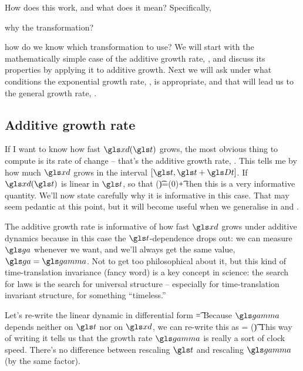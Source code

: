 How does this work, and what does it mean? Specifically, 
\bi
\item[1.]
why the transformation? 
\item[2.]
how do we know which transformation to use?
\ei
We will start with the mathematically simple case of the additive growth rate, , and discuss its properties by applying it to additive growth. Next we will ask under what conditions the exponential growth rate, , is appropriate, and that will lead us to the general growth rate, .


\subsection{Additive growth rate}
If I want to know how fast $\xd(\t)$ grows, the most obvious thing to compute is its rate of change -- that's the additive growth rate, .
This tells me by how much $\xd$ grows in the interval $[\t,\t+\Dt]$. If $\xd(\t)$ is linear in $\t$, so that 
\be
\xd(\t)=\xd(0)+\ggamma \t
{}
\ee
then this is a very informative quantity. We'll now state carefully why it is informative in this case. That may seem pedantic at this point, but it will become useful when we generalise in  and . 

The additive growth rate  is informative of how fast $\xd$ grows under additive 
dynamics  because in this case the $\t$-dependence drops out: we can measure 
$\gad$ whenever we want, and we'll always get the same value, $\gad=\ggamma$. Not to get 
too philosophical about it, but this kind of time-translation invariance (fancy word) is a key 
concept in science: the search for laws is the search for universal structure -- especially for 
time-translation invariant structure, for something ``timeless.''

Let's re-write the linear dynamic  in differential form
\be
\gd\xd=\ggamma \gd\t
\ee
Because $\ggamma$ depends neither on $\t$ nor on $\xd$, we can re-write this as
\be
\gd\xd= \gd(\ggamma \t)
\ee
This way of writing it tells us that the growth rate $\ggamma$ is really a sort of clock speed. 
There's no difference between rescaling $\t$ and rescaling $\ggamma$ (by the same factor).

